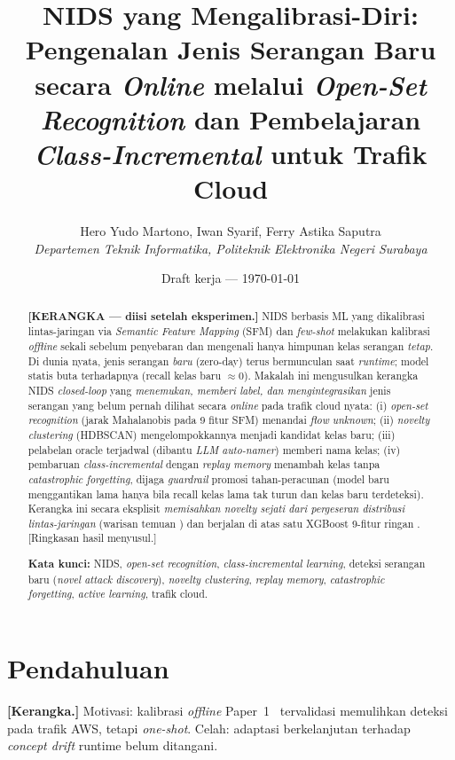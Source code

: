 \documentclass[11pt,a4paper]{article}
\title{\textbf{NIDS yang Mengalibrasi-Diri: Pengenalan Jenis Serangan Baru
secara \emph{Online} melalui \emph{Open-Set Recognition} dan Pembelajaran
\emph{Class-Incremental} untuk Trafik Cloud}}
\author{Hero Yudo Martono, \quad Iwan Syarif, \quad Ferry Astika Saputra \\
\textit{Departemen Teknik Informatika, Politeknik Elektronika Negeri Surabaya}}
\date{Draft kerja --- \today}
\begin{document}
\maketitle

\begin{abstract}
\textbf{[KERANGKA — diisi setelah eksperimen.]} NIDS berbasis ML yang dikalibrasi
lintas-jaringan via \emph{Semantic Feature Mapping} (SFM) dan \emph{few-shot}
\cite{paper1} melakukan kalibrasi \emph{offline} sekali sebelum penyebaran dan
mengenali hanya himpunan kelas serangan \emph{tetap}. Di dunia nyata, jenis
serangan \emph{baru} (zero-day) terus bermunculan saat \emph{runtime}; model
statis buta terhadapnya (recall kelas baru $\approx 0$). Makalah ini mengusulkan
kerangka NIDS \emph{closed-loop} yang \emph{menemukan, memberi label, dan
mengintegrasikan} jenis serangan yang belum pernah dilihat secara \emph{online}
pada trafik cloud nyata: (i) \emph{open-set recognition} (jarak Mahalanobis pada
9 fitur SFM) menandai \emph{flow} \emph{unknown}; (ii) \emph{novelty clustering}
(HDBSCAN) mengelompokkannya menjadi kandidat kelas baru; (iii) pelabelan oracle
terjadwal (dibantu \emph{LLM auto-namer}) memberi nama kelas; (iv) pembaruan
\emph{class-incremental} dengan \emph{replay memory} menambah kelas tanpa
\emph{catastrophic forgetting}, dijaga \emph{guardrail} promosi tahan-peracunan
(model baru menggantikan lama hanya bila recall kelas lama tak turun dan kelas baru
terdeteksi). Kerangka ini secara eksplisit \emph{memisahkan novelty sejati dari
pergeseran distribusi lintas-jaringan} (warisan temuan \cite{paper1}) dan berjalan
di atas satu XGBoost 9-fitur ringan \cite{paper2}. [Ringkasan hasil menyusul.]

\vspace{0.5em}
\noindent\textbf{Kata kunci:} NIDS, \emph{open-set recognition}, \emph{class-incremental
learning}, deteksi serangan baru (\emph{novel attack discovery}), \emph{novelty clustering},
\emph{replay memory}, \emph{catastrophic forgetting}, \emph{active learning}, trafik cloud.
\end{abstract}

\section{Pendahuluan}
\label{sec:intro}
\textbf{[Kerangka.]} Motivasi: kalibrasi \emph{offline} Paper~1~\cite{paper1}
tervalidasi memulihkan deteksi pada trafik AWS, tetapi \emph{one-shot}. Celah:
adaptasi berkelanjutan terhadap \emph{concept drift} runtime belum ditangani.
\end{document}
